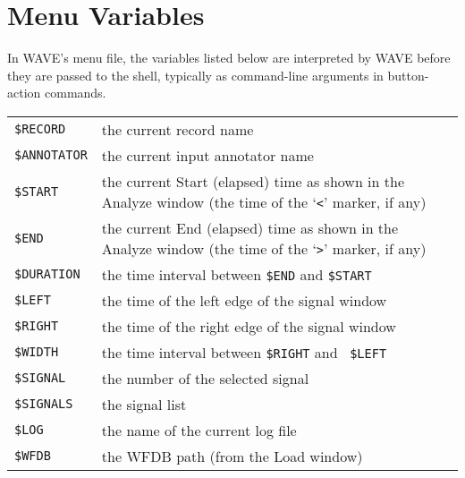 \documentclass[twoside]{book}
\newcommand{\WAVE}{{\sf WAVE}\xspace}
\begin{document}
\chapter{Menu Variables}
\label{ch:menu-variables}

In \WAVE{}'s menu file, the variables listed below are interpreted by
\WAVE{} before they are passed to the shell, typically as command-line
arguments in button-action commands.

\vspace{.5cm}
\begin{tabular*}{\textwidth}{l p{3.5 in}}
{\tt \$RECORD} & { the current record name } \\

{\tt \$ANNOTATOR} & { the current input annotator name } \\

{\tt \$START} &
{ the current {\sf Start (elapsed)} time as shown in the {\sf Analyze} window
(the time of the `{\tt <}' marker, if any) } \\

{\tt \$END} &
{ the current {\sf End (elapsed)} time as shown in the {\sf Analyze}
window (the time of the `{\tt >}' marker, if any) } \\

{\tt \$DURATION} &
{ the time interval between {\tt \$END} and {\tt \$START} } \\

{\tt \$LEFT} & { the time of the left edge of the signal window } \\

{\tt \$RIGHT} & { the time of the right edge of the signal window } \\

{\tt \$WIDTH} & { the time interval between {\tt \$RIGHT} and {\tt
\$LEFT} } \\

{\tt \$SIGNAL} & { the number of the selected signal } \\

{\tt \$SIGNALS} & { the signal list } \\

{\tt \$LOG} & { the name of the current log file } \\

{\tt \$WFDB} & { the WFDB path (from the {\sf Load} window) } \\


\end{tabular*}
\end{document}
